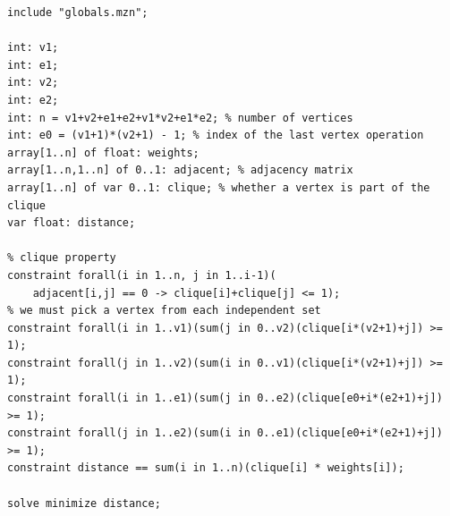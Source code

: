 \documentclass{article}
\theoremstyle{definition}
\begin{document}
\begin{lstlisting}
include "globals.mzn";

int: v1;
int: e1;
int: v2;
int: e2;
int: n = v1+v2+e1+e2+v1*v2+e1*e2; % number of vertices
int: e0 = (v1+1)*(v2+1) - 1; % index of the last vertex operation
array[1..n] of float: weights;
array[1..n,1..n] of 0..1: adjacent; % adjacency matrix
array[1..n] of var 0..1: clique; % whether a vertex is part of the clique
var float: distance;

% clique property
constraint forall(i in 1..n, j in 1..i-1)(
    adjacent[i,j] == 0 -> clique[i]+clique[j] <= 1);
% we must pick a vertex from each independent set
constraint forall(i in 1..v1)(sum(j in 0..v2)(clique[i*(v2+1)+j]) >= 1);
constraint forall(j in 1..v2)(sum(i in 0..v1)(clique[i*(v2+1)+j]) >= 1);
constraint forall(i in 1..e1)(sum(j in 0..e2)(clique[e0+i*(e2+1)+j]) >= 1);
constraint forall(j in 1..e2)(sum(i in 0..e1)(clique[e0+i*(e2+1)+j]) >= 1);
constraint distance == sum(i in 1..n)(clique[i] * weights[i]);

solve minimize distance;
\end{lstlisting}
\end{document}
